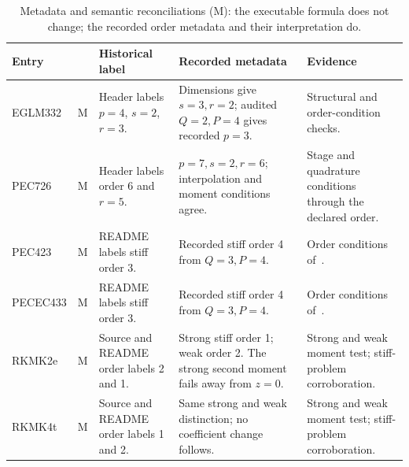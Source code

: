 \begin{table}[t]
\centering\small
\caption{Metadata and semantic reconciliations (M): the executable formula does not change; the recorded order metadata and their interpretation do.}\label{tab:reconciliation-meta}
\begin{tabularx}{\linewidth}{@{}p{2.45cm}p{.32cm}X X X@{}}\toprule
Entry & & Historical label & Recorded metadata & Evidence\\\midrule
EGLM332 & M & Header labels $p=4$, $s=2$, $r=3$. & Dimensions give $s=3,r=2$; audited $Q=2,P=4$ gives recorded $p=3$. & Structural and order-condition checks.\\\addlinespace
PEC726 & M & Header labels order 6 and $r=5$. & $p=7,s=2,r=6$; interpolation and moment conditions agree. & Stage and quadrature conditions through the declared order.\\\addlinespace
PEC423 & M & README labels stiff order 3. & Recorded stiff order 4 from $Q=3,P=4$. & Order conditions of~\cite{OstermannThalhammerWright2006}.\\\addlinespace
PECEC433 & M & README labels stiff order 3. & Recorded stiff order 4 from $Q=3,P=4$. & Order conditions of~\cite{OstermannThalhammerWright2006}.\\\addlinespace
RKMK2e & M & Source and README order labels 2 and 1. & Strong stiff order 1; weak order 2. The strong second moment fails away from $z=0$. & Strong and weak moment test; stiff-problem corroboration.\\\addlinespace
RKMK4t & M & Source and README order labels 1 and 2. & Same strong and weak distinction; no coefficient change follows. & Strong and weak moment test; stiff-problem corroboration.\\
\bottomrule
\end{tabularx}
\end{table}
